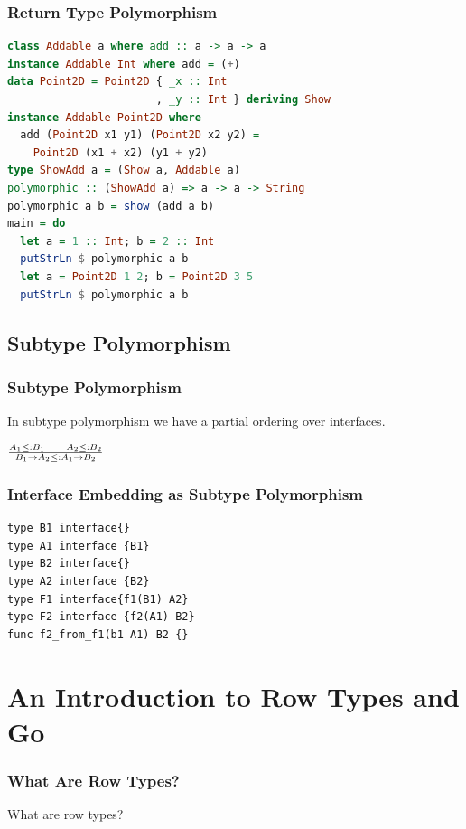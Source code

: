 \documentclass{beamer}
\newcommand{\hugecenter}[1]{\begin{center}\begin{huge}#1\end{huge}\end{center}}
\begin{document}
\begin{frame}[fragile]
  \frametitle{Return Type Polymorphism}
\begin{lstlisting}[language=Haskell]
class Addable a where add :: a -> a -> a
instance Addable Int where add = (+)
data Point2D = Point2D { _x :: Int
                       , _y :: Int } deriving Show
instance Addable Point2D where
  add (Point2D x1 y1) (Point2D x2 y2) =
    Point2D (x1 + x2) (y1 + y2)
type ShowAdd a = (Show a, Addable a)
polymorphic :: (ShowAdd a) => a -> a -> String
polymorphic a b = show (add a b)
main = do
  let a = 1 :: Int; b = 2 :: Int
  putStrLn $ polymorphic a b
  let a = Point2D 1 2; b = Point2D 3 5
  putStrLn $ polymorphic a b
\end{lstlisting}
\end{frame}

\subsection{Subtype Polymorphism}
\begin{frame}
  \frametitle{Subtype Polymorphism}
  In subtype polymorphism we have a partial ordering over interfaces.
  \begin{huge}
    \begin{center}
      \begin{math}
        \frac{A_1 \leq: B_1 \hspace{6mm} A_2 \leq: B_2}
        {B_1 \rightarrow A_2 \leq: A_1 \rightarrow B_2}
      \end{math}
    \end{center}
  \end{huge}
\end{frame}

\begin{frame}[fragile]
  \frametitle{Interface Embedding as Subtype Polymorphism}
\begin{lstlisting}[language=Golang]
type B1 interface{}
type A1 interface {B1}
type B2 interface{}
type A2 interface {B2}
type F1 interface{f1(B1) A2}
type F2 interface {f2(A1) B2}
func f2_from_f1(b1 A1) B2 {}
\end{lstlisting}
\end{frame}

\section{An Introduction to Row Types and Go}

\begin{frame}
  \frametitle{What Are Row Types?}
  \hugecenter{What are row types?}
\end{frame}
\end{document}
